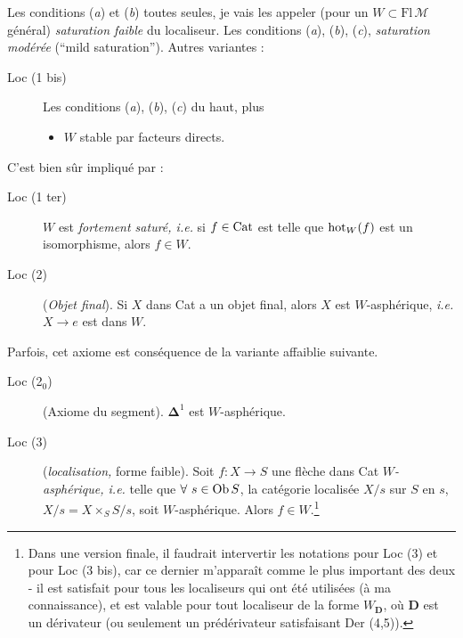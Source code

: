 Les conditions (\textit{a}) et (\textit{b}) toutes seules, je vais les appeler (pour un $W \subset \mathrm{Fl}\,\mathcal{M}$ général) \textit{saturation faible} du localiseur. Les conditions (\textit{a}), (\textit{b}), (\textit{c}), \textit{saturation modérée} (“mild saturation”). Autres variantes :

\begin{description}
\item[Loc (1 bis)] Les conditions (\textit{a}), (\textit{b}), (\textit{c}) du haut, plus
\begin{itemize}
\item[\textit{d})] $W$ stable par facteurs directs.
\end{itemize}
\end{description}

C’est bien sûr impliqué par :

\begin{description}
\item[Loc (1 ter)] $W$ est \textit{fortement saturé, i.e.} si $f \in \mathrm{Cat}$ est telle que $\mathrm{hot}_W(f)$ est un isomorphisme, alors $f \in W$.
\item[Loc (2)] (\textit{Objet final}). Si $X$ dans Cat a un objet final, alors $X$ est $W$-asphérique, \textit{i.e.} $X \longrightarrow e$ est dans $W$.
\end{description}

Parfois, cet axiome est conséquence de la variante affaiblie suivante.

\begin{description}
\item[Loc (2$_0$)] (Axiome du segment). $\boldsymbol{\Delta}^1$ est $W$-asphérique.
\end{description}


\begin{description}
\item[Loc (3)] (\textit{localisation,} forme faible). Soit $f : X \longrightarrow S$ une flèche dans Cat $W$\textit{-asphérique, i.e.} telle que $\forall\ s \in \mathrm{Ob}\, S$, la catégorie localisée $X/s$ sur $S$ en $s$, $X/s = X \times_S S/s$, soit $W$-asphérique. Alors $f \in W$.\footnote[1]{Dans une version finale, il faudrait intervertir les notations pour Loc (3) et pour Loc (3 bis), car ce dernier m’apparaît comme le plus important des deux - il est satisfait pour tous les localiseurs qui ont été utilisées (à ma connaissance), et est valable pour tout localiseur de la forme $W_{\mathbf{D}}$, où $\mathbf{D}$ est un dérivateur (ou seulement un prédérivateur satisfaisant Der (4,5)).} %
\end{description}

